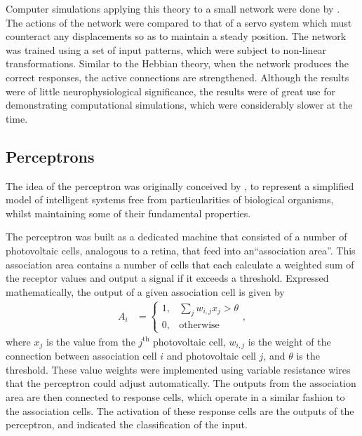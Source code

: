 Computer simulations applying this theory to a small network were done by
\cite{Farley:1954:Simulation}.
The actions of the network were compared to that of a servo system which must
counteract any displacements so as to maintain a steady position.
The network was trained using a set of input patterns, which were subject to
non-linear transformations.
Similar to the Hebbian theory, when the network produces the correct responses,
the active connections are strengthened.
Although the results were of little neurophysiological significance, the results
were of great use for demonstrating computational simulations, which were
considerably slower at the time.


\subsection{Perceptrons}

The idea of the perceptron was originally conceived by
\cite{Rosenblatt:1958:Perceptron}, to represent a simplified model of
intelligent systems free from particularities of biological organisms, whilst
maintaining some of their fundamental properties.

The perceptron was built as a dedicated machine that consisted of a number of
photovoltaic cells, analogous to a retina, that feed into an``association
area''.
This association area contains a number of cells that each calculate a weighted
sum of the receptor values and output a signal if it exceeds a threshold.
Expressed mathematically, the output of a given association cell is given by
\begin{align*}
    A_i &= \begin{cases}
        1, & \sum_j w_{i,j}x_j > \theta\\
        0, & \text{otherwise}
    \end{cases},
\end{align*}
where $x_j$ is the value from the $j^\text{th}$ photovoltaic cell, $w_{i,j}$
is the weight of the connection between association cell $i$ and photovoltaic
cell $j$, and $\theta$ is the threshold.
These value weights were implemented using variable resistance wires that the
perceptron could adjust automatically.
The outputs from the association area are then connected to response cells,
which operate in a similar fashion to the association cells.
The activation of these response cells are the outputs of the perceptron, and
indicated the classification of the input.

